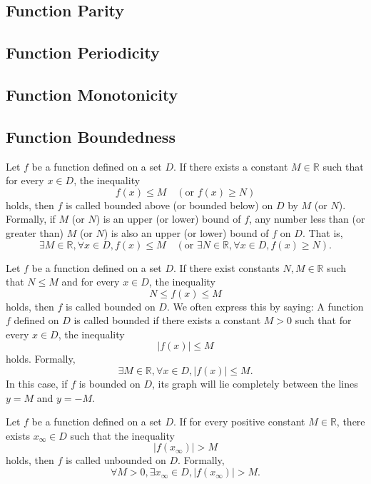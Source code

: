 \subsection{Function Parity}
\subsection{Function Periodicity}
\subsection{Function Monotonicity}
\subsection{Function Boundedness}
\begin{definition}
  Let \( f \) be a function defined on a set \( D \). If there exists a constant \( M \in \mathbb{R} \) such that for every \( x \in D \), the inequality 
  \[
  f(x) \leq M \quad (\text{or } f(x) \geq N)
  \]
  holds, then \( f \) is called bounded above (or bounded below) on \( D \) by \( M \) (or \( N \)). Formally, if \( M \) (or \( N \)) is an upper (or lower) bound of \( f \), any number less than (or greater than) \( M \) (or \( N \)) is also an upper (or lower) bound of \( f \) on \( D \). That is,
  \[
  \exists M \in \mathbb{R}, \forall x \in D, f(x) \leq M \quad (\text{or } \exists N \in \mathbb{R}, \forall x \in D, f(x) \geq N).
  \]
\end{definition}

\begin{definition}
  Let \( f \) be a function defined on a set \( D \). If there exist constants \( N, M \in \mathbb{R} \) such that \( N \leq M \) and for every \( x \in D \), the inequality 
  \[
  N \leq f(x) \leq M
  \]
  holds, then \( f \) is called bounded on \( D \). We often express this by saying: A function \( f \) defined on \( D \) is called bounded if there exists a constant \( M > 0 \) such that for every \( x \in D \), the inequality 
  \[
  |f(x)| \leq M
  \]
  holds. Formally,
  \[
  \exists M \in \mathbb{R}, \forall x \in D, |f(x)| \leq M.
  \]
  In this case, if \( f \) is bounded on \( D \), its graph will lie completely between the lines \( y = M \) and \( y = -M \).
\end{definition}

\begin{definition}
  Let \( f \) be a function defined on a set \( D \). If for every positive constant \( M \in \mathbb{R} \), there exists \( x_\infty \in D \) such that the inequality 
  \[
  |f(x_\infty)| > M
  \]
  holds, then \( f \) is called unbounded on \( D \). Formally,
  \[
  \forall M > 0, \exists x_\infty \in D, |f(x_\infty)| > M.
  \]
\end{definition}

